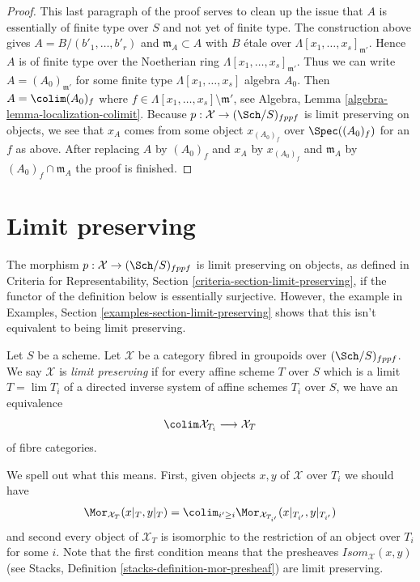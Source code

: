 \begin{proof}
\medskip\noindent
This last paragraph of the proof serves to clean up the issue that $A$ is
essentially of finite type over $S$ and not yet of finite type.
The construction above gives $A = B/(b'_1, \ldots, b'_r)$ and
$\mathfrak m_A \subset A$ with $B$ \'etale over
$\Lambda[x_1, \ldots, x_s]_{\mathfrak m'}$. Hence $A$ is of finite
type over the Noetherian ring $\Lambda[x_1, \ldots, x_s]_{\mathfrak m'}$.
Thus we can write $A = (A_0)_{\mathfrak m'}$ for some finite type
$\Lambda[x_1, \ldots, x_s]$ algebra $A_0$. Then
$A = \colim (A_0)_f$ where
$f \in \Lambda[x_1, \ldots, x_s] \setminus \mathfrak m'$, see
Algebra, Lemma \ref{algebra-lemma-localization-colimit}.
Because $p : \mathcal{X} \to (\Sch/S)_{fppf}$ is limit preserving on
objects, we see that
$x_A$ comes from some object $x_{(A_0)_f}$ over $\Spec((A_0)_f)$ for
an $f$ as above. After replacing $A$ by $(A_0)_f$ and $x_A$ by
$x_{(A_0)_f}$ and $\mathfrak m_A$ by $(A_0)_f \cap \mathfrak m_A$
the proof is finished.
\end{proof}





\section{Limit preserving}
\label{section-limits}

\noindent
The morphism $p : \mathcal{X} \to (\Sch/S)_{fppf}$ is limit preserving
on objects, as defined in Criteria for Representability, Section
\ref{criteria-section-limit-preserving}, if the functor of the definition
below is essentially surjective. However, the example
in Examples, Section \ref{examples-section-limit-preserving}
shows that this isn't equivalent to being limit preserving.

\begin{definition}
\label{definition-limit-preserving}
Let $S$ be a scheme. Let $\mathcal{X}$ be a category fibred in groupoids
over $(\Sch/S)_{fppf}$. We say $\mathcal{X}$ is {\it limit preserving}
if for every affine scheme $T$ over $S$ which is a limit $T = \lim T_i$
of a directed inverse system of affine schemes $T_i$ over $S$, we have
an equivalence
$$
\colim \mathcal{X}_{T_i} \longrightarrow \mathcal{X}_T
$$
of fibre categories.
\end{definition}

\noindent
We spell out what this means. First, given objects $x, y$ of $\mathcal{X}$
over $T_i$ we should have
$$
\Mor_{\mathcal{X}_T}(x|_T, y|_T) =
\colim_{i' \geq i} \Mor_{\mathcal{X}_{T_{i'}}}(x|_{T_{i'}}, y|_{T_{i'}})
$$
and second every object of $\mathcal{X}_T$ is isomorphic to the restriction
of an object over $T_i$ for some $i$. Note that the first condition means
that the presheaves $\mathit{Isom}_\mathcal{X}(x, y)$ (see
Stacks, Definition \ref{stacks-definition-mor-presheaf})
are limit preserving.

